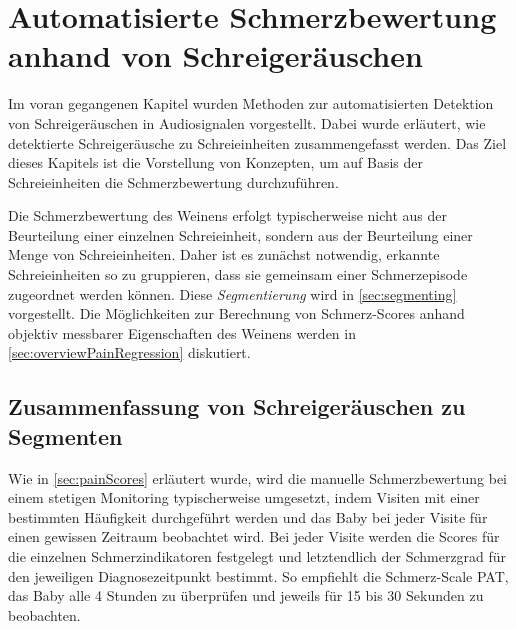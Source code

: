\chapter{Automatisierte Schmerzbewertung anhand von Schreigeräuschen}
\label{sec:deduction}

Im voran gegangenen Kapitel wurden Methoden zur automatisierten Detektion von Schreigeräuschen in Audiosignalen vorgestellt. Dabei wurde erläutert, wie detektierte Schreigeräusche zu Schreieinheiten zusammengefasst werden. Das Ziel dieses Kapitels ist die Vorstellung von Konzepten, um auf Basis der Schreieinheiten die Schmerzbewertung durchzuführen. 

Die Schmerzbewertung des Weinens erfolgt typischerweise nicht aus der Beurteilung einer einzelnen Schreieinheit, sondern aus der Beurteilung einer Menge von Schreieinheiten. Daher ist es zunächst notwendig, erkannte Schreieinheiten so zu gruppieren, dass sie gemeinsam einer Schmerzepisode zugeordnet werden können. Diese \emph{Segmentierung} wird in \autoref{sec:segmenting} vorgestellt. Die Möglichkeiten zur Berechnung von Schmerz-Scores anhand objektiv messbarer Eigenschaften des Weinens werden in \autoref{sec:overviewPainRegression} diskutiert.

\section{Zusammenfassung von Schreigeräuschen zu Segmenten}
\label{sec:segmenting}

Wie in \autoref{sec:painScores} erläutert wurde, wird die manuelle Schmerzbewertung bei einem stetigen Monitoring typischerweise umgesetzt, indem Visiten mit einer bestimmten Häufigkeit durchgeführt werden und das Baby bei jeder Visite für einen gewissen Zeitraum beobachtet wird. Bei jeder Visite werden die Scores für die einzelnen Schmerzindikatoren festgelegt und letztendlich der Schmerzgrad für den jeweiligen Diagnosezeitpunkt bestimmt. So empfiehlt die Schmerz-Scale PAT, das Baby alle 4 Stunden zu überprüfen und jeweils für 15 bis 30 Sekunden zu beobachten.


